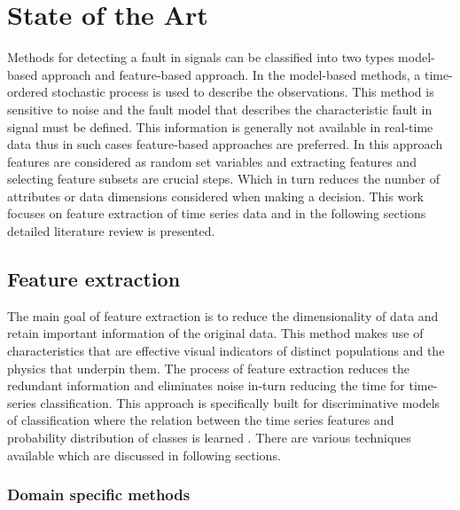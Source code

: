 

    \chapter{State of the Art}
    Methods for detecting a fault in signals can be classified into two types model-based approach and feature-based approach. In the model-based methods, a time-ordered stochastic process is used to describe the observations. This method is sensitive to noise and the fault model that describes the characteristic fault in signal must be defined. This information is generally not available in real-time data thus in such cases feature-based approaches are preferred. In this approach features are considered as random set variables and extracting features and selecting feature subsets are crucial steps. Which in turn reduces the number of attributes or data dimensions considered when making a decision. This work focuses on feature extraction of time series data and in the following sections detailed literature review is presented.
    \section{Feature extraction}
    The main goal of feature extraction is to reduce the dimensionality of data and retain important information of the original data. This method makes use of characteristics that are effective visual indicators of distinct populations and the physics that underpin them. The process of feature extraction reduces the redundant information and eliminates noise in-turn reducing the time for time-series classification. This approach is specifically built for discriminative models of classification where the relation between the time series features and probability distribution of classes is learned \cite{ismail2019deep}. There are various techniques available which are discussed in following sections. 
    \subsection{Domain specific methods}
    
